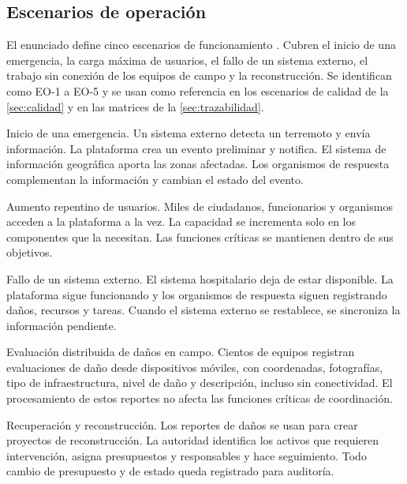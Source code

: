 \documentclass[11pt,letterpaper]{article}
\begin{document}
\subsection{Escenarios de operación}
\label{sec:escenarios-operacion}

El enunciado define cinco escenarios de funcionamiento \cite{enunciado}. Cubren el inicio de una
emergencia, la carga máxima de usuarios, el fallo de un sistema externo, el trabajo sin conexión de
los equipos de campo y la reconstrucción. Se identifican como EO-1 a EO-5 y se usan como referencia
en los escenarios de calidad de la \cref{sec:calidad} y en las matrices de la
\cref{sec:trazabilidad}.

\begin{description}[leftmargin=1.5cm,labelwidth=1.2cm,labelsep=0.3cm]
  \item[EO-1] Inicio de una emergencia. Un sistema externo detecta un terremoto y envía
        información. La plataforma crea un evento preliminar y notifica. El sistema de información
        geográfica aporta las zonas afectadas. Los organismos de respuesta complementan la
        información y cambian el estado del evento.
  \item[EO-2] Aumento repentino de usuarios. Miles de ciudadanos, funcionarios y organismos acceden
        a la plataforma a la vez. La capacidad se incrementa solo en los componentes que la
        necesitan. Las funciones críticas se mantienen dentro de sus objetivos.
  \item[EO-3] Fallo de un sistema externo. El sistema hospitalario deja de estar disponible. La
        plataforma sigue funcionando y los organismos de respuesta siguen registrando daños,
        recursos y tareas. Cuando el sistema externo se restablece, se sincroniza la información
        pendiente.
  \item[EO-4] Evaluación distribuida de daños en campo. Cientos de equipos registran evaluaciones
        de daño desde dispositivos móviles, con coordenadas, fotografías, tipo de infraestructura,
        nivel de daño y descripción, incluso sin conectividad. El procesamiento de estos reportes
        no afecta las funciones críticas de coordinación.
  \item[EO-5] Recuperación y reconstrucción. Los reportes de daños se usan para crear proyectos de
        reconstrucción. La autoridad identifica los activos que requieren intervención, asigna
        presupuestos y responsables y hace seguimiento. Todo cambio de presupuesto y de estado
        queda registrado para auditoría.
\end{description}
\end{document}
